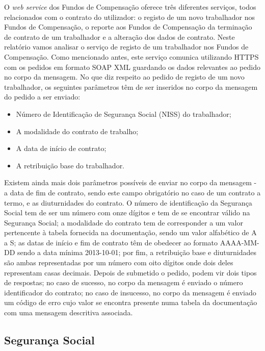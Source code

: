 \documentclass[sigplan]{acmart}
\begin{document}
O \textit{web service} dos Fundos de Compensação oferece três diferentes serviços, todos relacionados com o contrato do utilizador: o registo de um novo trabalhador nos Fundos de Compensação, o reporte aos Fundos de Compensação da terminação de contrato de um trabalhador e a alteração dos dados de contrato. Neste relatório vamos analisar o serviço de registo de um trabalhador nos Fundos de Compensação. Como mencionado antes, este serviço comunica utilizando HTTPS com os pedidos em formato SOAP XML guardando os dados relevantes ao pedido no corpo da mensagem. No que diz respeito ao pedido de registo de um novo trabalhador, os seguintes parâmetros têm de ser inseridos no corpo da mensagem do pedido a ser enviado:
\begin{itemize}
  \item Número de Identificação de Segurança Social (NISS) do trabalhador;
  \item A modalidade do contrato de trabalho;
  \item A data de início de contrato;
  \item A retribuição base do trabalhador.
\end{itemize}
Existem ainda mais dois parâmetros possíveis de enviar no corpo da mensagem - a data de fim de contrato, sendo este campo obrigatório no caso de um contrato a termo, e as diuturnidades do contrato. O número de identificação da Segurança Social tem de ser um número com onze dígitos e tem de se encontrar válido na Segurança Social; a modalidade do contrato tem de corresponder a um valor pertencente à tabela fornecida na documentação, sendo um valor alfabético de A a S; as datas de início e fim de contrato têm de obedecer ao formato AAAA-MM-DD sendo a data mínima 2013-10-01; por fim, a retribuição base e diuturnidades são ambas representadas por um número com oito dígitos onde dois deles representam casas decimais. Depois de submetido o pedido, podem vir dois tipos de respostas; no caso de sucesso, no corpo da mensagem é enviado o número identificador do contrato; no caso de insucesso, no corpo da mensagem é enviado um código de erro cujo valor se encontra presente numa tabela da documentação com uma mensagem descritiva associada.

\subsection{Segurança Social}
\end{document}
